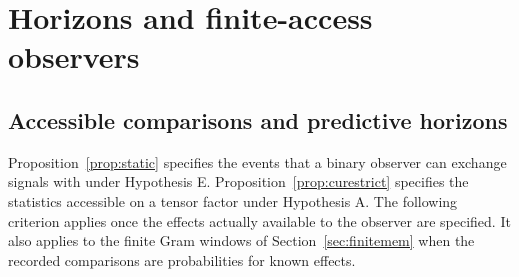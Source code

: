 \documentclass[aps,pra,onecolumn,superscriptaddress,nofootinbib,10pt]{revtex4-2}
\theoremstyle{definition}
\theoremstyle{remark}
\begin{document}
\section{Horizons and finite-access observers}\label{sec:horizons}

\subsection{Accessible comparisons and predictive horizons}\label{ob:horizons}

Proposition~\ref{prop:static} specifies the events that a binary observer
can exchange signals with under Hypothesis E. Proposition~\ref{prop:curestrict}
specifies the statistics accessible on a tensor factor under Hypothesis A.
The following criterion applies once the effects actually available to the
observer are specified. It also applies to the finite Gram windows of
Section~\ref{sec:finitemem} when the recorded comparisons are probabilities for
known effects.
\end{document}
